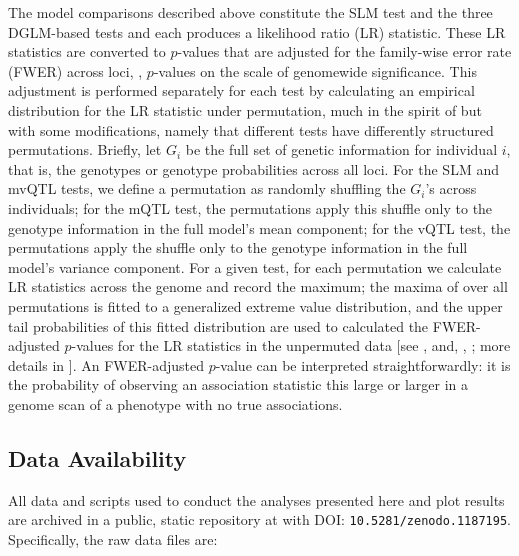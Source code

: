 The model comparisons described above constitute the SLM test and the three DGLM-based tests and each produces a likelihood ratio (LR) statistic.
These LR statistics are converted to $p$-values that are adjusted for the family-wise error rate (FWER) across loci, \ie, $p$-values on the scale of genomewide significance.
This adjustment is performed separately for each test by calculating an empirical distribution for the LR statistic under permutation, much in the spirit of \citet{Churchill1994} but with some modifications, namely that different tests have differently structured permutations.
Briefly, let $G_i$ be the full set of genetic information for individual $i$, that is, the genotypes or genotype probabilities across all loci.
For the SLM and mvQTL tests, we define a permutation as randomly shuffling the $G_i$'s across individuals; for the mQTL test, the permutations apply this shuffle only to the genotype information in the full model's mean component; for the vQTL test, the permutations apply the shuffle only to the genotype information in the full model's variance component.
For a given test, for each permutation we calculate LR statistics across the genome and record the maximum; the maxima of over all permutations is fitted to a generalized extreme value distribution, and the upper tail probabilities of this fitted distribution are used to calculated the FWER-adjusted $p$-values for the LR statistics in the unpermuted data [see \citealt{Dudbridge2004}, and, \eg, \citealt{Valdar06cc}; more details in \CortyMethodsPaper].
An FWER-adjusted $p$-value can be interpreted straightforwardly: it is the probability of observing an association statistic this large or larger in a genome scan of a phenotype with no true associations.

\subsection{Data Availability}

    All data and scripts used to conduct the analyses presented here and plot results are archived in a public, static repository at with DOI: \texttt{10.5281/zenodo.1187195}.
    Specifically, the raw data files are:

